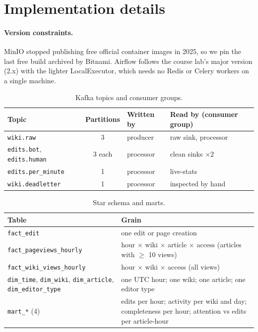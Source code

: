 \appendix
\section{Implementation details}\label{app:implementation}

\paragraph{Version constraints.} MinIO stopped publishing free official container images in 2025, so we
pin the last free build archived by Bitnami. Airflow follows the course lab's major version (2.x) with
the lighter LocalExecutor, which needs no Redis or Celery workers on a single machine.



\begin{table}[!ht]
  \centering\small
  \begin{tabular}{lcll}
    \toprule
    Topic & Partitions & Written by & Read by (consumer group) \\
    \midrule
    \texttt{wiki.raw}          & 3 & producer  & raw sink, processor \\
    \texttt{edits.bot}, \texttt{edits.human} & 3 each & processor & clean sinks $\times$2 \\
    \texttt{edits.per\_minute} & 1 & processor & live-stats \\
    \texttt{wiki.deadletter}   & 1 & processor & inspected by hand \\
    \bottomrule
  \end{tabular}
  \caption{Kafka topics and consumer groups.}
  \label{tab:topics}
\end{table}

\begin{table}[!ht]
  \centering\small
  \begin{tabularx}{\linewidth}{lX}
    \toprule
    Table & Grain \\
    \midrule
    \texttt{fact\_edit} & one edit or page creation \\
    \texttt{fact\_pageviews\_hourly} & hour $\times$ wiki $\times$ article $\times$ access (articles with $\geq$ 10 views) \\
    \texttt{fact\_wiki\_views\_hourly} & hour $\times$ wiki $\times$ access (all views) \\
    \texttt{dim\_time}, \texttt{dim\_wiki}, \texttt{dim\_article}, \texttt{dim\_editor\_type} & one UTC hour; one wiki; one article; one editor type \\
    \texttt{mart\_*} (4) & edits per hour; activity per wiki and day; completeness per hour; attention vs edits per article-hour \\
    \bottomrule
  \end{tabularx}
  \caption{Star schema and marts.}
  \label{tab:schema}
\end{table}


